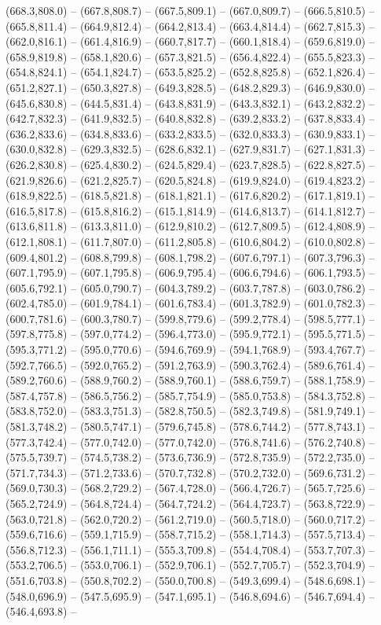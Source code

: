 (668.3,808.0) -- (667.8,808.7) -- (667.5,809.1) -- (667.0,809.7) -- (666.5,810.5) -- (665.8,811.4) -- (664.9,812.4) -- (664.2,813.4) -- (663.4,814.4) -- (662.7,815.3) -- (662.0,816.1) -- (661.4,816.9) -- (660.7,817.7) -- (660.1,818.4) -- (659.6,819.0) -- (658.9,819.8) -- (658.1,820.6) -- (657.3,821.5) -- (656.4,822.4) -- (655.5,823.3) -- (654.8,824.1) -- (654.1,824.7) -- (653.5,825.2) -- (652.8,825.8) -- (652.1,826.4) -- (651.2,827.1) -- (650.3,827.8) -- (649.3,828.5) -- (648.2,829.3) -- (646.9,830.0) -- (645.6,830.8) -- (644.5,831.4) -- (643.8,831.9) -- (643.3,832.1) -- (643.2,832.2) -- (642.7,832.3) -- (641.9,832.5) -- (640.8,832.8) -- (639.2,833.2) -- (637.8,833.4) -- (636.2,833.6) -- (634.8,833.6) -- (633.2,833.5) -- (632.0,833.3) -- (630.9,833.1) -- (630.0,832.8) -- (629.3,832.5) -- (628.6,832.1) -- (627.9,831.7) -- (627.1,831.3) -- (626.2,830.8) -- (625.4,830.2) -- (624.5,829.4) -- (623.7,828.5) -- (622.8,827.5) -- (621.9,826.6) -- (621.2,825.7) -- (620.5,824.8) -- (619.9,824.0) -- (619.4,823.2) -- (618.9,822.5) -- (618.5,821.8) -- (618.1,821.1) -- (617.6,820.2) -- (617.1,819.1) -- (616.5,817.8) -- (615.8,816.2) -- (615.1,814.9) -- (614.6,813.7) -- (614.1,812.7) -- (613.6,811.8) -- (613.3,811.0) -- (612.9,810.2) -- (612.7,809.5) -- (612.4,808.9) -- (612.1,808.1) -- (611.7,807.0) -- (611.2,805.8) -- (610.6,804.2) -- (610.0,802.8) -- (609.4,801.2) -- (608.8,799.8) -- (608.1,798.2) -- (607.6,797.1) -- (607.3,796.3) -- (607.1,795.9) -- (607.1,795.8) -- (606.9,795.4) -- (606.6,794.6) -- (606.1,793.5) -- (605.6,792.1) -- (605.0,790.7) -- (604.3,789.2) -- (603.7,787.8) -- (603.0,786.2) -- (602.4,785.0) -- (601.9,784.1) -- (601.6,783.4) -- (601.3,782.9) -- (601.0,782.3) -- (600.7,781.6) -- (600.3,780.7) -- (599.8,779.6) -- (599.2,778.4) -- (598.5,777.1) -- (597.8,775.8) -- (597.0,774.2) -- (596.4,773.0) -- (595.9,772.1) -- (595.5,771.5) -- (595.3,771.2) -- (595.0,770.6) -- (594.6,769.9) -- (594.1,768.9) -- (593.4,767.7) -- (592.7,766.5) -- (592.0,765.2) -- (591.2,763.9) -- (590.3,762.4) -- (589.6,761.4) -- (589.2,760.6) -- (588.9,760.2) -- (588.9,760.1) -- (588.6,759.7) -- (588.1,758.9) -- (587.4,757.8) -- (586.5,756.2) -- (585.7,754.9) -- (585.0,753.8) -- (584.3,752.8) -- (583.8,752.0) -- (583.3,751.3) -- (582.8,750.5) -- (582.3,749.8) -- (581.9,749.1) -- (581.3,748.2) -- (580.5,747.1) -- (579.6,745.8) -- (578.6,744.2) -- (577.8,743.1) -- (577.3,742.4) -- (577.0,742.0) -- (577.0,742.0) -- (576.8,741.6) -- (576.2,740.8) -- (575.5,739.7) -- (574.5,738.2) -- (573.6,736.9) -- (572.8,735.9) -- (572.2,735.0) -- (571.7,734.3) -- (571.2,733.6) -- (570.7,732.8) -- (570.2,732.0) -- (569.6,731.2) -- (569.0,730.3) -- (568.2,729.2) -- (567.4,728.0) -- (566.4,726.7) -- (565.7,725.6) -- (565.2,724.9) -- (564.8,724.4) -- (564.7,724.2) -- (564.4,723.7) -- (563.8,722.9) -- (563.0,721.8) -- (562.0,720.2) -- (561.2,719.0) -- (560.5,718.0) -- (560.0,717.2) -- (559.6,716.6) -- (559.1,715.9) -- (558.7,715.2) -- (558.1,714.3) -- (557.5,713.4) -- (556.8,712.3) -- (556.1,711.1) -- (555.3,709.8) -- (554.4,708.4) -- (553.7,707.3) -- (553.2,706.5) -- (553.0,706.1) -- (552.9,706.1) -- (552.7,705.7) -- (552.3,704.9) -- (551.6,703.8) -- (550.8,702.2) -- (550.0,700.8) -- (549.3,699.4) -- (548.6,698.1) -- (548.0,696.9) -- (547.5,695.9) -- (547.1,695.1) -- (546.8,694.6) -- (546.7,694.4) -- (546.4,693.8) -- 